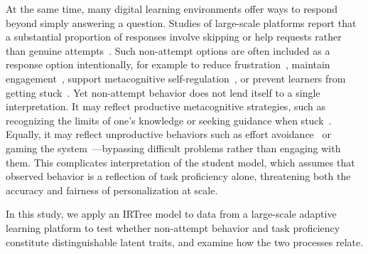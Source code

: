 \documentclass[11pt]{article}
\begin{document}
At the same time, many digital learning environments offer ways to respond beyond simply answering a question. Studies of large-scale platforms report that a substantial proportion of responses involve skipping or help requests rather than genuine attempts~\parencite{castro2015building, wang2011assistance, savi2018delaying, savi2023combating, gorgun2022considering}. Such non-attempt options are often included as a response option intentionally, for example to reduce frustration~\parencite{fidan2024emotions}, maintain engagement~\parencite{savi2018delaying}, support metacognitive self-regulation~\parencite{roll2015understanding}, or prevent learners from getting stuck~\parencite{aleven2000limitations}. Yet non-attempt behavior does not lend itself to a single interpretation. It may reflect productive metacognitive strategies, such as recognizing the limits of one's knowledge or seeking guidance when stuck~\parencite{fleur2021metacognition, shields2024active}. Equally, it may reflect unproductive behaviors such as effort avoidance~\parencite{savi2023combating} or gaming the system~\parencite{baker2004off}---bypassing difficult problems rather than engaging with them. This complicates interpretation of the student model, which assumes that observed behavior is a reflection of task proficiency alone, threatening both the accuracy and fairness of personalization at scale.

In this study, we apply an IRTree model to data from a large-scale adaptive learning platform to test whether non-attempt behavior and task proficiency constitute distinguishable latent traits, and examine how the two processes relate.
 
\end{document}
